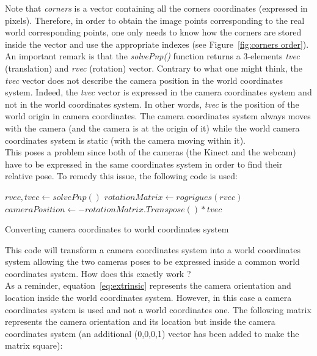 Note that \textit{corners} is a vector containing all the corners coordinates (expressed in pixels). Therefore, in order to obtain the image points corresponding to the real world corresponding points, one only needs to know how the corners are stored inside the vector and use the appropriate indexes (see Figure~\ref{fig:corners order}). \\

An important remark is that the \textit{solvePnp()} function returns a 3-elements \textit{tvec} (translation) and \textit{rvec} (rotation) vector. Contrary to what one might think, the \textit{tvec} vector does not describe the camera position in the world coordinates system. Indeed, the \textit{tvec} vector is expressed in the camera coordinates system and not in the world coordinates system. In other words, \textit{tvec} is the position of the world origin in camera coordinates. The camera coordinates system always moves with the camera (and the camera is at the origin of it) while the world camera coordinates system is static (with the camera moving within it).\\

This poses a problem since both of the cameras (the Kinect and the webcam) have to be expressed in the same coordinates system in order to find their relative pose. To remedy this issue, the following code is used:\\

\begin{algorithm}[H]
  \begin{algorithmic}
    \State $rvec, tvec\gets solvePnp()$
    \State $rotationMatrix \gets rogrigues(rvec)$
    \State $cameraPosition \gets -rotationMatrix.Transpose() * tvec$ 
  \caption{Converting camera coordinates to world coordinates system}
  \label{algo:pose in world coordinates}
  \end{algorithmic}
\end{algorithm}


This code will transform a camera coordinates system into a world coordinates system allowing the two cameras poses to be expressed inside a common world coordinates system. How does this exactly work ? \\

As a reminder, equation~\ref{eq:extrinsic} represents the camera orientation and location inside the world coordinates system. However, in this case a camera coordinates system is used and not a world coordinates one. The following matrix represents the camera orientation and its location but inside the camera coordinates system (an additional (0,0,0,1) vector has been added to make the matrix square):

